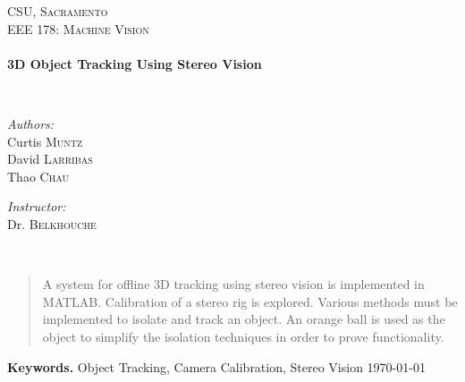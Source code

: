 \begin{titlepage}
\begin{center}


\textsc{\LARGE CSU, Sacramento}\\[1.5cm]

\textsc{\Large EEE 178: Machine Vision}\\[0.5cm]

\HRule \\[0.4cm]
{ \huge \bfseries 3D Object Tracking Using Stereo Vision\\[0.4cm] }

\HRule \\[1.5cm]

\begin{minipage}{0.4\textwidth}
\begin{flushleft} \large
\emph{Authors:}\\
Curtis \textsc{Muntz}\\
David \textsc{Larribas}\\
Thao \textsc{Chau} \\
\end{flushleft}
\end{minipage}
\begin{minipage}{0.4\textwidth}
\begin{flushright} \large
\emph{Instructor:} \\
Dr. \textsc{Belkhouche}\\
\end{flushright}
\end{minipage}
\\[2.5cm]
\begin{abstract}
A system for offline 3D tracking using stereo vision is implemented in MATLAB. Calibration of a stereo rig is explored. Various methods must be implemented to isolate and track an object. An orange ball is used as the object to simplify the isolation techniques in order to prove functionality. 
\end{abstract}

\smallskip
\noindent \textbf{Keywords.} Object Tracking, Camera Calibration, Stereo Vision
\vfill
{\large \today}

\end{center}
\end{titlepage}